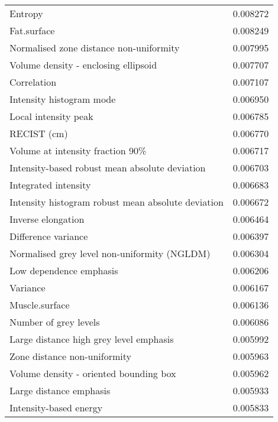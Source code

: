 \begin{longtable}{|lr|}
Entropy                                            &        0.008272 \\
Fat.surface                                        &        0.008249 \\
Normalised zone distance non-uniformity            &        0.007995 \\
Volume density - enclosing ellipsoid               &        0.007707 \\
Correlation                                        &        0.007107 \\
Intensity histogram mode                           &        0.006950 \\
Local intensity peak                               &        0.006785 \\
RECIST (cm)                                        &        0.006770 \\
Volume at intensity fraction 90\%                   &        0.006717 \\
Intensity-based robust mean absolute deviation     &        0.006703 \\
Integrated intensity                               &        0.006683 \\
Intensity histogram robust mean absolute deviation &        0.006672 \\
Inverse elongation                                 &        0.006464 \\
Difference variance                                &        0.006397 \\
Normalised grey level non-uniformity (NGLDM)       &        0.006304 \\
Low dependence emphasis                            &        0.006206 \\
Variance                                           &        0.006167 \\
Muscle.surface                                     &        0.006136 \\
Number of grey levels                              &        0.006086 \\
Large distance high grey level emphasis            &        0.005992 \\
Zone distance non-uniformity                       &        0.005963 \\
Volume density - oriented bounding box             &        0.005962 \\
Large distance emphasis                            &        0.005933 \\
Intensity-based energy                             &        0.005833 \\

\end{longtable}
